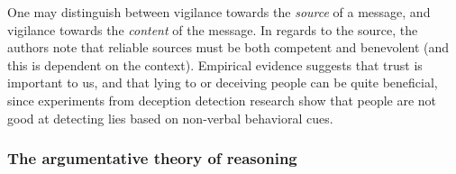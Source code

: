 One may distinguish between vigilance towards the \emph{source} of a message, and vigilance towards the \emph{content} of the message.
In regards to the source, the authors note that reliable sources must be both competent and benevolent (and this is dependent on the context).
Empirical evidence suggests that trust is important to us, and that lying to or deceiving people can be quite beneficial, since experiments from deception detection research show that people are not good at detecting lies based on non-verbal behavioral cues.

\subsubsection{The argumentative theory of reasoning}

